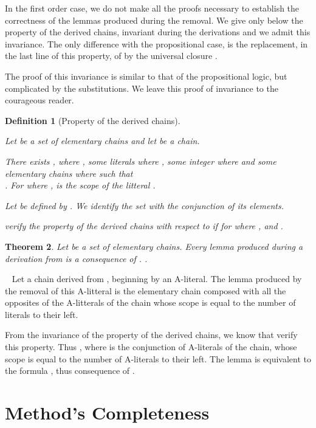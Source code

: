 \documentclass{article}
\newtheorem{theoreme}{Theorem}\newtheorem{lemme}[theoreme]{Lemma}
\newtheorem{definition}[theoreme]{Definition}
\newenvironment{preuve}{\noindent {\em Proof :}\ }{{\hfill
    }\vspace{.5pc}} \newcommand{\sg}{\!\!<\!\!}
\begin{document}
In the first order case, we do not make all the proofs necessary to establish the correctness of the lemmas produced during
the removal.
We give only below the property of the derived chains, invariant during the derivations and we admit this invariance.
The only difference with the propositional case, is the replacement, in the last line
of this property,  of  by the universal closure .

The proof of this invariance is similar to that of the propositional logic, but complicated by the substitutions.
We leave this proof of invariance to the courageous reader.




\begin{definition}[Property of the derived chains]\label{prop-chaine-derivee-1}

Let  be a set of elementary chains and let  be a chain.

There exists , where ,  some literals  where , some integer  where 
and some elementary chains
  where  such that \\.
For  where ,  is the scope of the litteral .

Let  be defined by 
 .
We identify the set  with the  \emph{conjunction} of its elements.


 verify the property of the derived chains with respect to  if
for   where ,  and .
\end{definition}



\begin{theoreme}
Let  be a set of elementary chains.
Every lemma produced during a derivation from  is a consequence of .
.
\end{theoreme}

\begin{preuve}
Let  a chain derived from , beginning by an A-literal. The lemma produced by the removal of this A-litteral is
the elementary chain composed with all the opposites of the 
A-litterals of the chain whose scope is equal to the number of literals to their left.

From the invariance of the property of the derived chains, we 
know that  verify this property. Thus , where  is the conjunction
of A-literals of the chain, whose scope is equal to the number of A-literals to their left. The lemma is equivalent to
the formula , thus consequence of .

\end{preuve}

\section{Method's Completeness}
\end{document}
